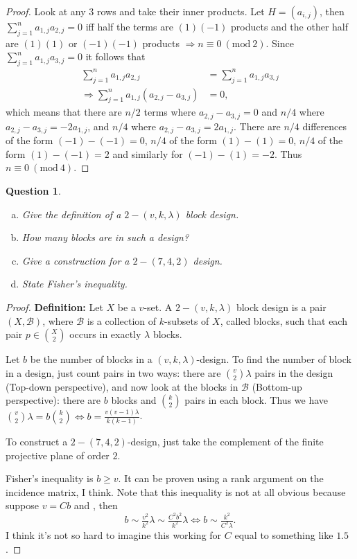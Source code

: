 \documentclass[12]{article}
\newcommand{\Mod}[1]{\ (\mathrm{mod}\ #1)}
\newtheorem{question}{Question}
\theoremstyle{definition}
\begin{document}
	\begin{proof}
		Look at any $3$ rows and take their inner products.  Let $H = (a_{i,j})$, then $\sum_{j = 1}^n a_{1,j}a_{2,j} = 0$ iff half the terms are $(1)(-1)$ products and the other half are $(1)(1)$ or $(-1)(-1)$ products $\Rightarrow n \equiv 0 \Mod{2}$.  Since $\sum_{j = 1}^n a_{1,j}a_{3,j} = 0$ it follows that
		\begin{align*}
			\sum_{j = 1}^n a_{1,j}a_{2,j} &= \sum_{j = 1}^n a_{1,j}a_{3,j}	\\
			\Rightarrow \sum_{j=1}^n a_{1,j}(a_{2,j} - a_{3,j}) &= 0,
		\end{align*}
		which means that there are $n/2$ terms where $a_{2,j} - a_{3,j} = 0$ and $n/4$ where $a_{2,j} - a_{3,j} = -2a_{1,j}$, and $n/4$ where $a_{2,j} - a_{3,j} = 2a_{1,j}$.  There are $n/4$ differences of the form $(-1)-(-1) = 0$, $n/4$ of the form $(1)-(1) = 0$, $n/4$ of the form $(1)-(-1) = 2$ and similarly for $(-1)-(1) = -2$.  Thus $n \equiv 0 \Mod{4}$.
	\end{proof}
	
	\begin{question}
		\
		\begin{enumerate}[a)]
			\item Give the definition of a $2-(v,k,\lambda)$ block design.
			\item How many blocks are in such a design?
			\item Give a construction for a $2-(7,4,2)$ design.
			\item State Fisher's inequality.
		\end{enumerate}
	\end{question}
	
	\begin{proof}
		\textbf{Definition:} Let $X$ be a $v$-set.  A $2-(v,k,\lambda)$ block design is a pair $(X, \mathcal{B})$, where $\mathcal{B}$ is a collection of $k$-subsets of $X$, called blocks, such that each pair $p \in {X \choose 2}$ occurs in exactly $\lambda$ blocks.
		
		Let $b$ be the number of blocks in a $(v,k,\lambda)$-design.  To find the number of block in a design, just count pairs in two ways: there are ${v \choose 2}\lambda$ pairs in the design (Top-down perspective), and now look at the blocks in $\mathcal{B}$ (Bottom-up perspective): there are $b$ blocks and ${k \choose 2}$ pairs in each block.  Thus we have ${v \choose 2}\lambda = b{k \choose 2} \Leftrightarrow b = \tfrac{v(v-1)\lambda}{k(k-1)}$.
		
		To construct a $2-(7,4,2)$-design, just take the complement of the finite projective plane of order $2$.
		
		Fisher's inequality is $b \geq v$.  It can be proven using a rank argument on the incidence matrix, I think.  Note that this inequality is not at all obvious because suppose $v= Cb$ and , then
		$$b \sim \tfrac{v^2}{k^2}\lambda \sim \tfrac{C^2b^2}{k^2}\lambda \Leftrightarrow b \sim \tfrac{k^2}{C^2\lambda}.$$
		I think it's not so hard to imagine this working for $C$ equal to something like $1.5$.
		
	\end{proof}
	
\end{document}
